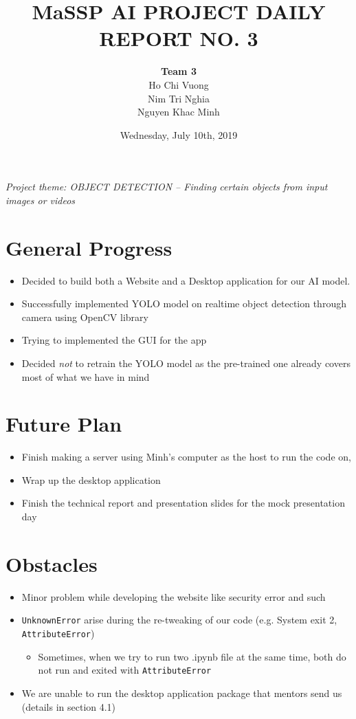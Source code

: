 \documentclass{article}
\title{\textbf{MaSSP AI PROJECT DAILY REPORT NO. 3}}
\author{\textbf{Team 3}\\
Ho Chi Vuong\\
Nim Tri Nghia\\
Nguyen Khac Minh}
\date{Wednesday, July 10th, 2019}
\newcommand{\code}[1]{\texttt{#1}}
\begin{document}
\maketitle
\textit{Project theme: OBJECT DETECTION – Finding certain objects from input images or videos} 
\graphicspath{ {./images/} }

\section{General Progress }
\begin{itemize}
	\item Decided to build both a Website and a Desktop application for our AI model.
	\item Successfully implemented YOLO model on realtime object detection through camera using OpenCV library
	\item Trying to implemented the GUI for the app
	\item Decided \textit{not} to retrain the YOLO model as the pre-trained one already covers most of what we have in mind
\end{itemize}
	


\section{Future Plan}

\begin{itemize}
	\item Finish making a server using Minh's computer as the host to run the code on, 
	\item Wrap up the desktop application
	\item Finish the technical report and presentation slides for the mock presentation day
\end{itemize}

\section{Obstacles}
\begin{itemize}
	\item Minor problem while developing the website like security error and such
	\item \code{UnknownError} arise during the re-tweaking of our code (e.g. System exit 2, \code{AttributeError})
	\begin{itemize}
		\item Sometimes, when we try to run two .ipynb file at the same time, both do not run and exited with \code{AttributeError}
	\end{itemize}
	\item We are unable to run the desktop application package that mentors send us (details in section 4.1)
\end{itemize}
\end{document}
